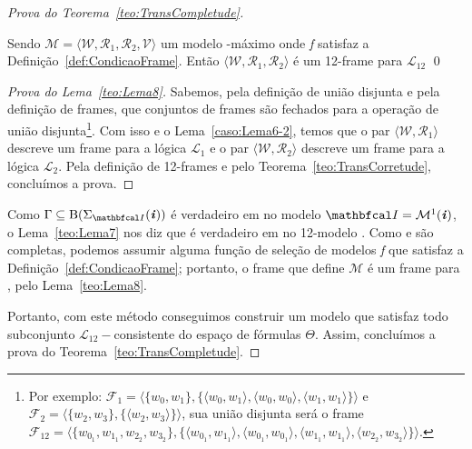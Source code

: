 \begin{apendicesenv}
\begin{proof}[Prova do Teorema~\ref{teo:TransCompletude}]
            \begin{lema}
                \label{teo:Lema8}
                Sendo \(\mathcal{M} = \langle \mathcal{W}, \mathcal{R}_{1}, \mathcal{R}_{2}, \mathcal{V} \rangle\) um modelo -máximo onde \textit{f} satisfaz
                a Definição~\ref{def:CondicaoFrame}. Então \(\langle \mathcal{W}, \mathcal{R}_{1}, \mathcal{R}_{2}\rangle\) é um 12-frame para \(\mathcal{L}_{12}\) \qed
            \end{lema}

            \begin{proof}[Prova do Lema~\ref{teo:Lema8}]
                Sabemos, pela definição de união disjunta e pela definição de frames, que conjuntos de frames são fechados para a operação de união
                disjunta\footnote{Por exemplo: \(\mathcal{F}_{1} = \langle \{w_{0}, w_{1}\}, \{\langle w_{0}, w_{1} \rangle, \langle w_{0}, w_{0} \rangle,
                \langle w_{1}, w_{1} \rangle\} \rangle\) e \(\mathcal{F}_{2} = \langle \{w_{2}, w_{3}\}, \{\langle w_{2}, w_{3} \rangle\} \rangle\), sua união disjunta será
                o frame \(\mathcal{F}_{12} = \langle \{w_{{0}_{1}}, w_{{1}_{1}}, w_{{2}_{2}}, w_{{3}_{2}}\}, \{\langle w_{{0}_{1}}, w_{{1}_{1}} \rangle, \langle w_{{0}_{1}}, w_{{0}_{1}} \rangle,
                \langle w_{{1}_{1}}, w_{{1}_{1}} \rangle, \langle w_{{2}_{2}}, w_{{3}_{2}} \rangle\} \rangle\).}.
                Com isso e o Lema~\ref{caso:Lema6-2}, temos que o par \(\langle \mathcal{W}, \mathcal{R}_{1} \rangle\) descreve um frame para a lógica \(\mathcal{L}_{1}\) e o par
                \(\langle \mathcal{W}, \mathcal{R}_{2} \rangle\) descreve um frame para a lógica \(\mathcal{L}_{2}\). Pela definição de 12-frames e pelo Teorema~\ref{teo:TransCorretude},
                concluímos a prova.
            \end{proof}

            Como \(\Gamma \subseteq \funcao{B}(\Sigma_{\modeloinicial}(\mundoinicial))\) é verdadeiro em \Mundoinicial no modelo \(\modeloinicial = \mathcal{M}^{1}(\mundoinicial)\), o
            Lema~\ref{teo:Lema7} nos diz que \GAMMA é verdadeiro em \Mundoinicial no 12-modelo . Como  e  são completas, podemos assumir
            alguma função de seleção de modelos \textit{f} que satisfaz a Definição~\ref{def:CondicaoFrame}; portanto, o frame que define \(\mathcal{M}\) é um frame para
            , pelo Lema~\ref{teo:Lema8}.

            Portanto, com este método conseguimos construir um modelo que satisfaz todo subconjunto \(\mathcal{L}_{12}-\)consistente do espaço de fórmulas \(\Theta\).
            Assim, concluímos a prova do Teorema~\ref{teo:TransCompletude}.
        \end{proof}


\end{apendicesenv}
